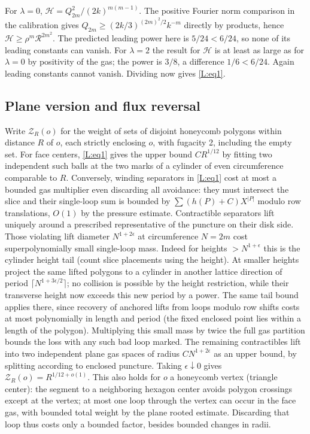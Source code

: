 For \(\lambda=0\), \(\mathcal H=Q_{2m}^2/(2k)^{m(m-1)}\). The positive Fourier norm comparison in the calibration gives \(Q_{2m}\ge (2k/3)^{(2m)^2/2} k^{-m}\) directly by products, hence \(\mathcal H\ge \rho^m\mathcal R^{2m^2}\). The predicted leading power here is \(5/24<6/24\), so none of its leading constants can vanish. For \(\lambda=2\) the result for \(\mathcal H\) is at least as large as for \(\lambda=0\) by positivity of the gas; the power is \(3/8\), a difference \(1/6<6/24\). Again leading constants cannot vanish. Dividing now gives \eqref{L:eq1}.

\subsection{Plane version and flux reversal}\label{L:step13}

Write \(\mathcal Z_R(o)\) for the weight of sets of disjoint honeycomb polygons within distance \(R\) of \(o\), each strictly enclosing \(o\), with fugacity 2, including the empty set. For face centers, \eqref{L:eq1} gives the upper bound \(C R^{1/12}\) by fitting two independent such balls at the two marks of a cylinder of even circumference comparable to \(R\). Conversely, winding separators in \eqref{L:eq1} cost at most a bounded gas multiplier even discarding all avoidance: they must intersect the slice and their single-loop sum is bounded by \(\sum (h(P)+C)X^{|P|}\) modulo row translations, \(O(1)\) by the pressure estimate. Contractible separators lift uniquely around a prescribed representative of the puncture on their disk side. Those violating lift diameter \(N^{1+2\epsilon}\) at circumference \(N=2m\) cost superpolynomially small single-loop mass. Indeed for heights \(>N^{1+\epsilon}\) this is the cylinder height tail (count slice placements using the height). At smaller heights project the same lifted polygons to a cylinder in another lattice direction of period \(\lceil N^{1+3\epsilon/2}\rceil\); no collision is possible by the height restriction, while their transverse height now exceeds this new period by a power. The same tail bound applies there, since recovery of anchored lifts from loops modulo row shifts costs at most polynomially in length and period (the fixed enclosed point lies within a length of the polygon). Multiplying this small mass by twice the full gas partition bounds the loss with any such bad loop marked. The remaining contractibles lift into two independent plane gas spaces of radius \(C N^{1+2\epsilon}\) as an upper bound, by splitting according to enclosed puncture. Taking \(\epsilon\downarrow0\) gives
\(\mathcal Z_R(o)=R^{1/12+o(1)}\).
This also holds for \(o\) a honeycomb vertex (triangle center): the segment to a neighboring hexagon center avoids polygon crossings except at the vertex; at most one loop through the vertex can occur in the face gas, with bounded total weight by the plane rooted estimate. Discarding that loop thus costs only a bounded factor, besides bounded changes in radii.

